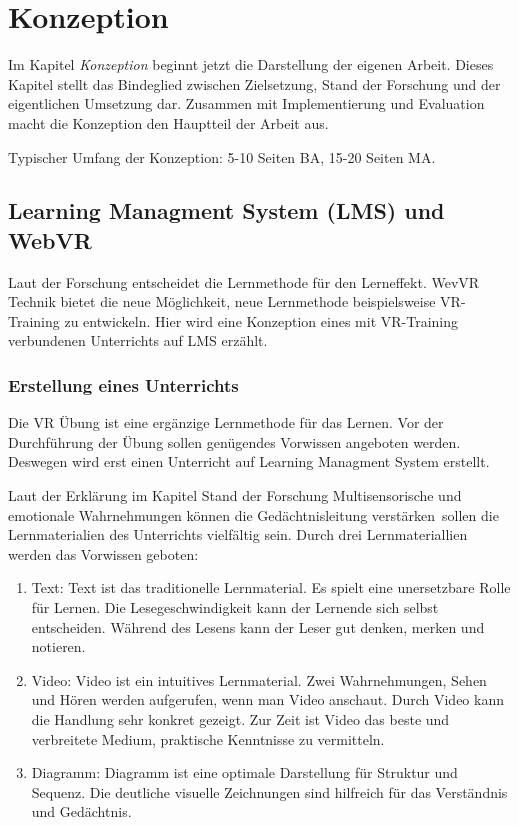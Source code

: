 \chapter{Konzeption}

Im Kapitel {\em Konzeption} beginnt jetzt die Darstellung der eigenen Arbeit. Dieses Kapitel stellt das Bindeglied zwischen Zielsetzung, Stand der Forschung und der eigentlichen Umsetzung dar. Zusammen mit Implementierung und Evaluation macht die Konzeption den Hauptteil der Arbeit aus.

Typischer Umfang der Konzeption: 5-10 Seiten BA, 15-20 Seiten MA.

\section{Learning Managment System (LMS) und WebVR}
Laut der Forschung entscheidet die Lernmethode für den Lerneffekt. WevVR Technik bietet die neue Möglichkeit, neue Lernmethode beispielsweise VR-Training zu entwickeln. Hier wird eine Konzeption eines mit VR-Training verbundenen Unterrichts auf LMS erzählt.

 \subsection{Erstellung eines Unterrichts}
 Die VR Übung ist eine ergänzige Lernmethode für das Lernen. Vor der Durchführung der Übung sollen genügendes Vorwissen angeboten werden. Deswegen wird erst einen Unterricht auf Learning Managment System erstellt.

 Laut der Erklärung im Kapitel Stand der Forschung \glqq Multisensorische und emotionale Wahrnehmungen können die Gedächtnisleitung verstärken\grqq\ sollen die Lernmaterialien des Unterrichts vielfältig sein.  Durch drei Lernmateriallien werden das Vorwissen geboten:
 \begin{enumerate}
    \item Text: Text ist das traditionelle Lernmaterial. Es spielt eine unersetzbare Rolle für Lernen. Die Lesegeschwindigkeit kann der Lernende sich selbst entscheiden. Während des Lesens kann der Leser gut denken, merken und notieren.
    \item Video: Video ist ein intuitives Lernmaterial. Zwei Wahrnehmungen, Sehen und Hören werden aufgerufen, wenn man Video anschaut. Durch Video kann die Handlung sehr konkret gezeigt. Zur Zeit ist Video das beste und verbreitete Medium, praktische Kenntnisse zu vermitteln.
    \item Diagramm: Diagramm ist eine optimale Darstellung für Struktur und Sequenz. Die deutliche visuelle Zeichnungen sind hilfreich für das Verständnis und Gedächtnis.
 \end{enumerate}


